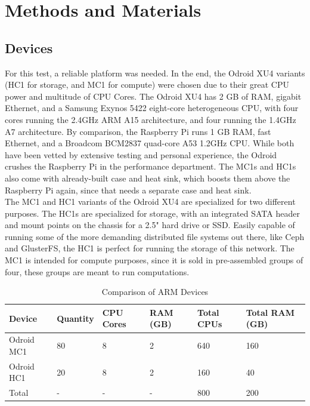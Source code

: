 \documentclass[12pt]{spieman}  %
\begin{document}
\section{Methods and Materials}
\label{sec:met-mat}
\subsection{Devices}
\label{subsec:arm-groups}

For this test, a reliable platform was needed. In the end, the Odroid XU4 variants (HC1 for storage, and MC1 for compute) were chosen due to their great CPU power and multitude of CPU Cores. The Odroid XU4 has 2 GB of RAM, gigabit Ethernet, and a Samsung Exynos 5422 eight-core heterogeneous CPU, with four cores running the 2.4GHz ARM A15 architecture, and four running the 1.4GHz A7 architecture. By comparison, the Raspberry Pi runs 1 GB RAM, fast Ethernet, and a Broadcom BCM2837 quad-core A53 1.2GHz CPU. While both have been vetted by extensive testing and personal experience, the Odroid crushes the Raspberry Pi in the performance department. The MC1s and HC1s also come with already-built case and heat sink, which boosts them above the Raspberry Pi again, since that needs a separate case and heat sink.\\

The MC1 and HC1 variants of the Odroid XU4 are specialized for two different purposes. The HC1s are specialized for storage, with an integrated SATA header and mount points on the chassis for a 2.5" hard drive or SSD. Easily capable of running some of the more demanding distributed file systems out there, like Ceph and GlusterFS, the HC1 is perfect for running the storage of this network. The MC1 is intended for compute purposes, since it is sold in pre-assembled groups of four, these groups are meant to run computations.

\begin{table}[ht]
\caption{Comparison of ARM Devices} 
\label{tab:device-analysis}
\begin{center}       
\begin{tabular}{|l|l|l|l|l|l|}
\hline
\rule[-1ex]{0pt}{3.5ex}  Device & Quantity & CPU Cores & RAM (GB) & Total CPUs & Total RAM (GB) \\
\hline\hline
\rule[-1ex]{0pt}{3.5ex}  Odroid MC1 & 80 & 8 & 2 &  640 & 160 \\
\hline
\rule[-1ex]{0pt}{3.5ex}  Odroid HC1 & 20 & 8 & 2 &  160 & 40 \\
\hline
\rule[-1ex]{0pt}{3.5ex}  Total & - & - & - & 800 & 200 \\
\hline
\end{tabular}
\end{center}
\end{table} 
\end{document}
